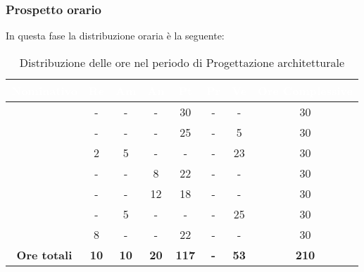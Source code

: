 \subsubsection{Prospetto orario}
In questa fase la distribuzione oraria è la seguente:
\begin{table}[H]
	\begin{center}
		\begin{tabular}{ c c c c c c c c }
		\rowcolor{darkblue} 
		\textcolor{white}{\textbf{Nominativo}} & \textcolor{white}{\textbf{Re}} & \textcolor{white}{\textbf{Am}} & \textcolor{white}{\textbf{An}} & \textcolor{white}{\textbf{Pt}} & \textcolor{white}{\textbf{Pr}} & \textcolor{white}{\textbf{Ve}} & \textcolor{white}{\textbf{Ore Complessive}} \\ \hline
		\BL & -  & -  & - & 30 & - & - & 30 \\ \hline
		\FF & -  & -  & - & 25 & - & 5  & 30 \\ \hline
		\MM & 2  & 5  & - & - & - & 23  & 30 \\ \hline
		\PC & - & -  & 8 & 22 & - & - & 30 \\ \hline
		\TG & -  & - & 12 & 18 & - & - & 30 \\ \hline
		\TL & -  & 5 & - & - & - & 25 & 30 \\ \hline
		\VD & 8  & -  & - & 22 & - & -  & 30 \\ \hline
		\textbf{Ore totali} & \textbf{10} & \textbf{10} & \textbf{20} & \textbf{117} & \textbf{-} & \textbf{53} & \textbf{210} \\ \hline
		\end{tabular}
	\caption{Distribuzione delle ore nel periodo di Progettazione architetturale}
	\end{center}
\end{table}
